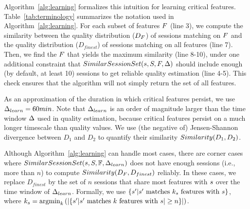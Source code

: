 Algorithm~\ref{alg:learning}  formalizes this intuition for learning 
critical features. 
Table~\ref{tab:terminology} summarizes the notation used in
Algorithm~\ref{alg:learning}.
For each subset of features $F$ (line 3), 
we compute the similarity between the quality distribution 
($D_{F}$) of sessions matching on $F$ 
and the quality distribution ($D_{finest}$) of sessions
matching on all features (line 7). 
Then, we find the $F$ that yields the maximum 
similarity (line 8-10), under one additional constraint that 
$SimilarSessionSet(s,S,F,\Delta)$ 
should include enough (by default, at least 10) sessions to get 
reliable quality estimation (line 4-5).
This check ensures that the algorithm will not simply return the set of all features.



As an approximation of the duration in which critical features 
persist, we use $\Delta_{learn}=60min$.
Note that $\Delta_{learn}$ is an order of magnitude 
larger than the time window $\Delta$ used in 
quality estimation, because critical features persist on a 
much longer timescale than quality values.
We use (the negative of) Jensen-Shannon 
divergence between $D_1$ and $D_2$ to quantify their 
similarity $Similarity(D_1,D_2)$.





Although Algorithm~\ref{alg:learning} can handle most cases, 
there are corner cases where
$SimilarSessionSet(s,S,\mathbb{F},\Delta_{learn})$ 
does not have enough sessions (i.e., more than $n$) to 
compute $Similarity(D_{F},D_{finest})$ reliably. 
In these cases, we replace $D_{finest}$ by the set of $n$ 
sessions that share most features with $s$ 
over the time window of $\Delta_{learn}$. 
Formally, we use 
$\{s'|s'\textrm{ matches $k_{s}$ 
features with }s\}$, 
where $k_{s}=\operatorname*{argmin}_k\left(|\{s'|s'\textrm{ matches $k$ features with }s\right|\geq n\}|)$.





